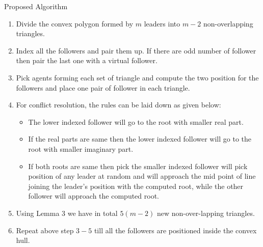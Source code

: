 	\begin{frame}
		\begin{block}{Proposed Algorithm}
			\begin{enumerate}
				\item Divide the convex polygon formed by $m$ leaders into $m-2$ non-overlapping triangles. 
				\item Index all the followers and pair them up. If there are odd number of follower then pair the last one with a virtual follower. 
				\item Pick agents forming each set of triangle and compute the two position for the followers and place one pair of follower in each triangle.
				\item For conflict resolution, the rules can be laid down as given below:
				\begin{itemize}
					\item The lower indexed follower will go to the root with smaller real part.
					\item If the real parts are same then the lower indexed follower will go to the root with smaller imaginary part.
					\item If both roots are same then pick the smaller indexed follower will pick position of any leader at random and will approach the mid point of line joining the leader's position with the computed root, while the other follower will approach the computed root.   
				\end{itemize}
				\item Using Lemma 3 we have in total $5(m-2)$ new non-over-lapping triangles.
				\item Repeat above step $3-5$ till all the followers are positioned inside the convex hull. 
			\end{enumerate}
		\end{block}
	\end{frame}
	
